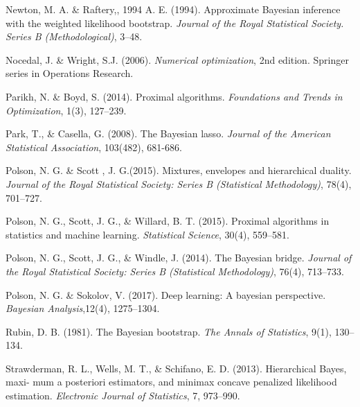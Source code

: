 \documentclass[12pt]{TD-CJS}
\begin{document}
\begin{thebibliography}{}
%

Newton, M. A. \& Raftery,, 1994 A. E.  (1994). Approximate Bayesian inference with the weighted likelihood bootstrap. {\it Journal of the Royal Statistical Society. Series B (Methodological)}, 3--48.

Nocedal, J. \& Wright, S.J. (2006). {\em Numerical optimization}, 2nd edition. Springer series in Operations Research.

Parikh, N. \&  Boyd, S. (2014). Proximal algorithms. {\it Foundations and Trends in Optimization}, 1(3), 127--239.

Park, T., \& Casella, G. (2008). The Bayesian lasso. {\it Journal of the American Statistical Association}, 103(482), 681-686.

Polson, N. G. \&  Scott , J. G.(2015). Mixtures, envelopes and hierarchical duality. {\it Journal of the Royal Statistical Society: Series B (Statistical Methodology)},  78(4), 701--727.

Polson, N. G.,  Scott, J. G., \& Willard, B. T.  (2015). Proximal algorithms in statistics and machine learning. {\it Statistical Science}, 30(4), 559--581.

Polson, N. G.,  Scott, J. G., \& Windle, J. (2014). The Bayesian bridge. {\it Journal of the Royal Statistical Society: Series B (Statistical Methodology)}, 76(4), 713--733.

Polson, N. G. \&  Sokolov, V. (2017). Deep learning: A bayesian perspective. {\it Bayesian Analysis},12(4), 1275--1304.

Rubin, D. B. (1981). The Bayesian bootstrap. {\it The Annals of Statistics}, 9(1), 130--134.

Strawderman, R. L., Wells, M. T., \& Schifano, E. D. (2013). Hierarchical Bayes, maxi- mum a posteriori estimators, and minimax concave penalized likelihood estimation. {\it Electronic Journal of Statistics}, 7, 973--990.


\end{thebibliography}
\end{document}
